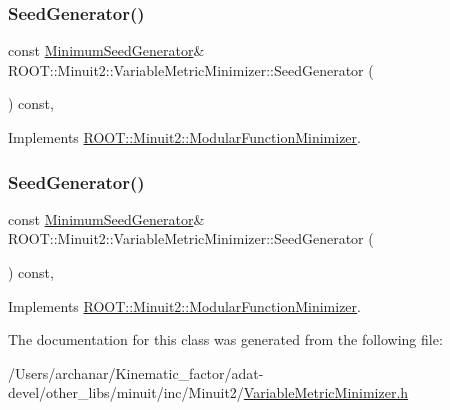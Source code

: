 \subsubsection{\texorpdfstring{SeedGenerator()}{SeedGenerator()}\hspace{0.1cm}{\footnotesize\ttfamily [2/3]}}
{\footnotesize\ttfamily const \mbox{\hyperlink{classROOT_1_1Minuit2_1_1MinimumSeedGenerator}{Minimum\+Seed\+Generator}}\& R\+O\+O\+T\+::\+Minuit2\+::\+Variable\+Metric\+Minimizer\+::\+Seed\+Generator (\begin{DoxyParamCaption}{ }\end{DoxyParamCaption}) const\hspace{0.3cm}{\ttfamily [inline]}, {\ttfamily [virtual]}}



Implements \mbox{\hyperlink{classROOT_1_1Minuit2_1_1ModularFunctionMinimizer_a742930de97b0ce9ba23773874ae0894b}{R\+O\+O\+T\+::\+Minuit2\+::\+Modular\+Function\+Minimizer}}.

\mbox{\label{classROOT_1_1Minuit2_1_1VariableMetricMinimizer_a8ac2123142283dd05611842236caeadb}} 
\subsubsection{\texorpdfstring{SeedGenerator()}{SeedGenerator()}\hspace{0.1cm}{\footnotesize\ttfamily [3/3]}}
{\footnotesize\ttfamily const \mbox{\hyperlink{classROOT_1_1Minuit2_1_1MinimumSeedGenerator}{Minimum\+Seed\+Generator}}\& R\+O\+O\+T\+::\+Minuit2\+::\+Variable\+Metric\+Minimizer\+::\+Seed\+Generator (\begin{DoxyParamCaption}{ }\end{DoxyParamCaption}) const\hspace{0.3cm}{\ttfamily [inline]}, {\ttfamily [virtual]}}



Implements \mbox{\hyperlink{classROOT_1_1Minuit2_1_1ModularFunctionMinimizer_a742930de97b0ce9ba23773874ae0894b}{R\+O\+O\+T\+::\+Minuit2\+::\+Modular\+Function\+Minimizer}}.



The documentation for this class was generated from the following file\+:\begin{DoxyCompactItemize}
\item 
/\+Users/archanar/\+Kinematic\+\_\+factor/adat-\/devel/other\+\_\+libs/minuit/inc/\+Minuit2/\mbox{\hyperlink{adat-devel_2other__libs_2minuit_2inc_2Minuit2_2VariableMetricMinimizer_8h}{Variable\+Metric\+Minimizer.\+h}}\end{DoxyCompactItemize}
